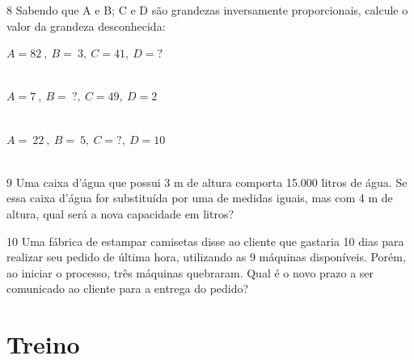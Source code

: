 \num{8} Sabendo que A e B; C e D são grandezas inversamente proporcionais,
calcule o valor da grandeza desconhecida:

\begin{escolha}
\item $A = 82\ ,\ B = \ 3,\ C = 41,\ D = ?$ \\ 
 \\
\item $A = 7\ ,\ B = \ ?,\ C = 49,\ D = 2$ \\
 \\
\item $A = \ 22\ ,\ B = \ 5,\ C = ?,\ D = 10$ \\
  \\
\end{escolha}

\num{9} Uma caixa d'água que possui 3 m de altura comporta 15.000 litros de
água. Se essa caixa d'água for substituída por uma de medidas iguais,
mas com 4 m de altura, qual será a nova capacidade em litros?


\num{10} Uma fábrica de estampar camisetas disse ao cliente que gastaria 10
dias para realizar seu pedido de última hora, utilizando as 9 máquinas
disponíveis. Porém, ao iniciar o processo, três máquinas quebraram. Qual
é o novo prazo a ser comunicado ao cliente para a entrega do pedido?


\section{Treino}

